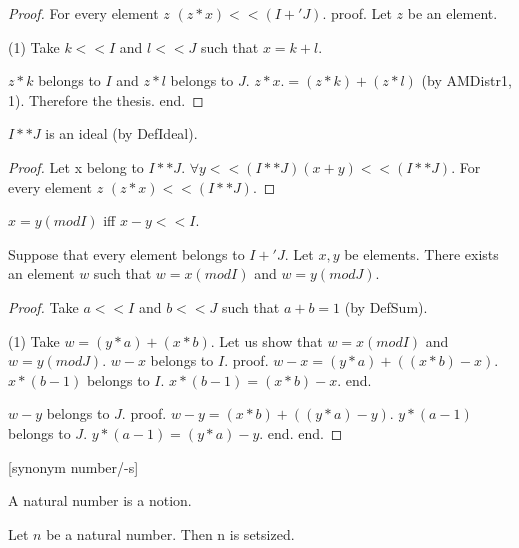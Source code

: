\documentclass{article}
\begin{document}
\begin{forthel}
\begin{proof}
      For every element $z$ $(z * x) << (I +' J)$.
      proof.
        Let $z$ be an element.

        (1) Take $k << I$ and $l << J$ such that $x = k + l$.

        $z * k$ belongs to $I$ and $z * l$ belongs to $J$. $z * x .= (z * k) + (z * l)$ (by AMDistr1, 1). Therefore the thesis.
      end.
    \end{proof}


    \begin{lemma}[IdeInt]
      $I ** J$ is an ideal (by DefIdeal).
    \end{lemma}
    \begin{proof}
      Let x belong to $I ** J$. $\forall y << (I ** J) (x + y) << (I ** J)$. For every element $z$ $(z * x) << (I** J)$.
    \end{proof}

    \begin{definition}[DefMod]
      $x = y (mod I)$ iff $x - y << I$.
    \end{definition}

    \begin{theorem}[ChineseRemainder]
      Suppose that every element belongs to $I +' J$. Let $x, y$ be elements. There exists an element $w$ such that $w = x (mod I)$ and $w = y (mod J)$.
    \end{theorem}
    \begin{proof}
      Take $a << I$ and $b << J$ such that $a + b = 1$ (by DefSum).

      (1) Take $w = (y * a) + (x * b)$.
      Let us show that $w = x (mod I)$ and $w = y (mod J)$.
        $w - x$ belongs to $I$.
        proof.
          $w - x = (y * a) + ((x * b) - x)$. $x * (b - 1)$ belongs to $I$. $x * (b - 1) = (x * b) - x$.
        end.

        $w - y$ belongs to $J$.
        proof.
          $w - y = (x * b) + ((y * a) - y)$. $y * (a - 1)$ belongs to $J$. $y * (a - 1) = (y * a) - y$.
        end.
      end.
    \end{proof}


    [synonym number/-s]

    \begin{signature}[NatSort]
      A natural number is a notion.
    \end{signature}

    \begin{axiom}
      Let $n$ be a natural number. Then n is setsized.
    \end{axiom}


\end{forthel}
\end{document}
